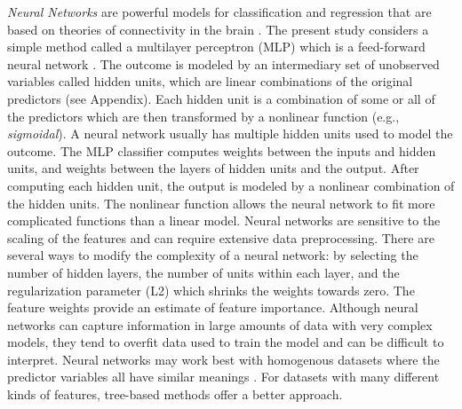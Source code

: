 \documentclass[sigconf]{acmart}
\begin{document}
\emph{Neural Networks} are powerful models for classification and regression 
that are based on theories of connectivity in the brain \cite{kuhn13}. 
The present study considers a simple method called a multilayer perceptron 
(MLP) which is a feed-forward neural network \cite{muller17, raschka17}. 
The outcome is modeled by an intermediary set of unobserved variables called 
hidden units, which are linear combinations of the original predictors
(see Appendix). Each hidden unit is a combination of some or all of the 
predictors which are then transformed by a nonlinear function (e.g., 
\emph{sigmoidal}). A neural network usually has multiple hidden units used 
to model the outcome. The MLP classifier computes weights between the inputs 
and hidden units, and weights between the layers of hidden units and the 
output. After computing each hidden unit, the output is modeled by a nonlinear 
combination of the hidden units. The nonlinear function allows the neural 
network to fit more complicated functions than a linear model. Neural networks 
are sensitive to the scaling of the features and can require extensive data 
preprocessing. There are several ways to modify the complexity of a neural 
network: by selecting the number of hidden layers, the number of units within 
each layer, and the regularization parameter (L2) which shrinks the weights 
towards zero. The feature weights provide an estimate of feature importance.
Although neural networks can capture information in large amounts of data 
with very complex models, they tend to overfit data used to train the model 
and can be difficult to interpret. Neural networks may work best with 
homogenous datasets where the predictor variables all have similar meanings 
\cite{muhuri13}. For datasets with many different kinds of features, 
tree-based methods offer a better approach.

\end{document}
